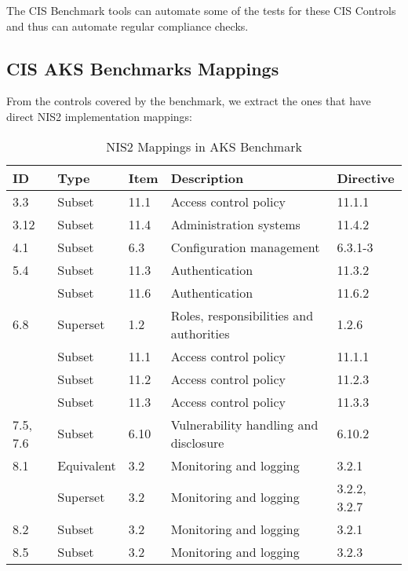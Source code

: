 The CIS Benchmark tools can automate some of the tests for these CIS Controls and thus can automate regular compliance checks.

\pagebreak

\subsection{CIS AKS Benchmarks Mappings}

From the controls covered by the benchmark, we extract the ones that have direct NIS2 implementation mappings:

\begin{table}[ht]
  \caption{NIS2 Mappings in AKS Benchmark}
    \begin{tabular}{| l | l | l | l | l |}
    \hline
    ID & Type & Item & Description & Directive \\
    \hline\hline
    3.3 & Subset & 11.1 & Access control policy & 11.1.1 \\
    \hline
    3.12 & Subset & 11.4 & Administration systems & 11.4.2 \\
    \hline
    4.1 & Subset & 6.3 & Configuration management & 6.3.1-3 \\
    \hline
    5.4 & Subset & 11.3 & Authentication & 11.3.2 \\
    \hline
    & Subset & 11.6 & Authentication & 11.6.2 \\
    \hline
    6.8 & Superset & 1.2 & Roles, responsibilities and authorities & 1.2.6 \\
    \hline
    & Subset & 11.1 & Access control policy & 11.1.1 \\
    \hline
    & Subset & 11.2 & Access control policy & 11.2.3 \\
    \hline
    & Subset & 11.3 & Access control policy & 11.3.3 \\
    \hline
    7.5, 7.6 & Subset & 6.10 & Vulnerability handling and disclosure & 6.10.2 \\
    \hline
    8.1 & Equivalent & 3.2 & Monitoring and logging & 3.2.1 \\
    \hline
    & Superset & 3.2 & Monitoring and logging & 3.2.2, 3.2.7 \\
    \hline
    8.2 & Subset & 3.2 & Monitoring and logging & 3.2.1 \\
    \hline
    8.5 & Subset & 3.2 & Monitoring and logging & 3.2.3 \\
    \hline
    \end{tabular}%
  \label{tab:aksMapping}%
\end{table}%

